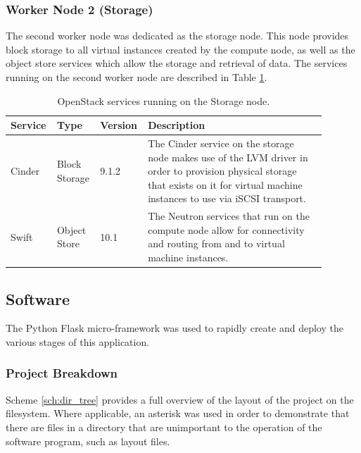 \subsubsection{Worker Node 2 (Storage)}

The second worker node was dedicated as the storage node. This node provides block storage to all virtual instances created by the compute node, as well as the object store services which allow the storage and retrieval of data. The services running on the second worker node are described in Table \ref{tab:openstack_worker2_services}.

\begin{longtable}[c]{@{}p{0.12\linewidth}p{0.12\linewidth}p{0.1\linewidth}p{0.55\linewidth}@{}}
\caption[OpenStack Storage Node Service List]{OpenStack services running on the Storage node.}
\label{tab:openstack_worker2_services}\\
\toprule
Service & Type          & Version & Description                                                                                                                                                                                                              \\* \midrule
\endhead
%
Cinder  & Block Storage & 9.1.2   & The Cinder service on the storage node makes use of the LVM driver in order to provision physical storage that exists on it for virtual machine instances to use via iSCSI transport.               \\
Swift   & Object Store  & 10.1    & The Neutron services that run on the compute node allow for connectivity and routing from and to virtual machine instances. \\* \bottomrule
\end{longtable}

\subsection{Software}

The Python Flask micro-framework was used to rapidly create and deploy the various stages of this application.

\subsubsection{Project Breakdown}

Scheme \ref{sch:dir_tree} provides a full overview of the layout of the project on the filesystem. Where applicable, an asterisk was used in order to demonstrate that there are files in a directory that are unimportant to the operation of the software program, such as layout files.


